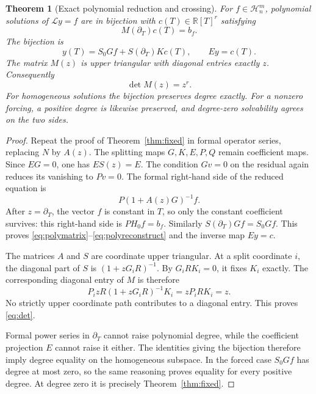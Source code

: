 \documentclass[11pt,a4paper]{article}
\numberwithin{equation}{section}
\newtheorem{theorem}{Theorem}[section]
\theoremstyle{definition}
\theoremstyle{remark}\newtheorem{remark}[theorem]{Remark}
\newcommand{\R}{\mathbb R}\newcommand{\C}{\mathbb C}
\newcommand{\Hh}{\mathcal H}\newcommand{\Ll}{\mathcal L}
\newcommand{\dd}{\partial_T}\newcommand{\eps}{\varepsilon}
\begin{document}
\begin{theorem}[Exact polynomial reduction and crossing]
\label{thm:reduction}
For $f\in\Hh_n^m$, polynomial solutions of $\Ll y=f$ are in bijection with $c(T)\in\R[T]^r$ satisfying
\begin{equation}
 M(\dd)c(T)=b_f.
 \label{eq:polymatrix}
\end{equation}
The bijection is
\begin{equation}
 y(T)=S_0Gf+S(\dd)Kc(T),\qquad Ey=c(T).
 \label{eq:polyreconstruct}
\end{equation}
The matrix $M(z)$ is upper triangular with diagonal entries exactly $z$. Consequently
\begin{equation}
 \det M(z)=z^r.
 \label{eq:det}
\end{equation}
For homogeneous solutions the bijection preserves degree exactly. For a nonzero forcing, a positive degree is likewise preserved, and degree-zero solvability agrees on the two sides.
\end{theorem}
\begin{proof}
Repeat the proof of Theorem~\ref{thm:fixed} in formal operator series, replacing $N$ by $A(z)$. The splitting maps $G,K,E,P,Q$ remain coefficient maps. Since $EG=0$, one has $ES(z)=E$. The condition $Gv=0$ on the residual again reduces its vanishing to $Pv=0$. The formal right-hand side of the reduced equation is
\[
 P(1+A(z)G)^{-1}f.
\]
After $z=\dd$, the vector $f$ is constant in $T$, so only the constant coefficient survives: this right-hand side is $PH_0f=b_f$. Similarly $S(\dd)Gf=S_0Gf$. This proves \eqref{eq:polymatrix}--\eqref{eq:polyreconstruct} and the inverse map $Ey=c$.

The matrices $A$ and $S$ are coordinate upper triangular. At a split coordinate $i$, the diagonal part of $S$ is $(1+zG_iR)^{-1}$. By $G_iRK_i=0$, it fixes $K_i$ exactly. The corresponding diagonal entry of $M$ is therefore
\[
 P_i zR(1+zG_iR)^{-1}K_i=zP_iRK_i=z.
\]
No strictly upper coordinate path contributes to a diagonal entry. This proves \eqref{eq:det}.

Formal power series in $\dd$ cannot raise polynomial degree, while the coefficient projection $E$ cannot raise it either. The identities giving the bijection therefore imply degree equality on the homogeneous subspace. In the forced case $S_0Gf$ has degree at most zero, so the same reasoning proves equality for every positive degree. At degree zero it is precisely Theorem~\ref{thm:fixed}.
\end{proof}
\end{document}
